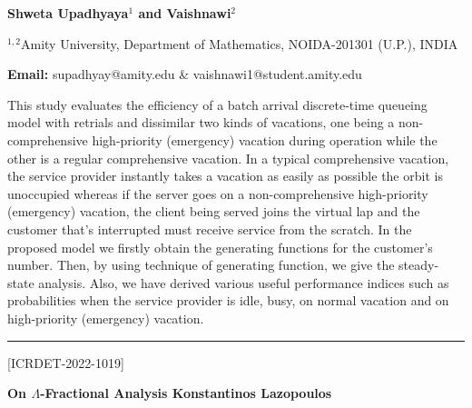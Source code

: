 \documentclass[twoside,11pt]{amsart}
\begin{document}
\centerline{\textbf{Shweta Upadhyaya$^{1}$ and Vaishnawi$^{2}$  }}
\vskip 5mm
\begin{flushleft}
$^{1,2}$Amity University, Department of Mathematics, NOIDA-201301 (U.P.), INDIA

\vskip 5mm
\end{flushleft}
\vskip 2mm
\begin{flushleft}
{\bf Email:} supadhyay@amity.edu \& vaishnawi1@student.amity.edu
\end{flushleft}
\vskip 5mm
 This study evaluates the efficiency of a batch arrival discrete-time queueing model with retrials and dissimilar two kinds of vacations, one being a non-comprehensive high-priority (emergency) vacation during operation while the other is a regular comprehensive vacation. In a typical comprehensive vacation, the service provider instantly takes a vacation as easily as possible the orbit is unoccupied whereas if the server goes on a non-comprehensive high-priority (emergency) vacation, the client being served joins the virtual lap and the customer that’s interrupted must receive service from the scratch. In the proposed model we firstly obtain the generating functions for the customer’s number. Then, by using technique of generating function, we give the steady-state analysis. Also, we have derived various useful performance indices such as probabilities when the service provider is idle, busy, on normal vacation and on high-priority (emergency) vacation.
\vskip 2mm
\rule{\textwidth}{0.5pt}

\vskip 5mm
\begin{flushleft}
\centerline{[ICRDET-2022-1019]}
\end{flushleft}
\begin{center}\bf\LARGE
On $\Lambda$-Fractional Analysis
Konstantinos Lazopoulos
\end{center}
\vskip 2mm
\end{document}
